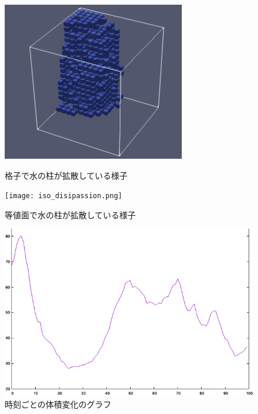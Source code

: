 \documentclass[a4j,12pt]{jreport}
\begin{document}
\begin{figure}[H]
  \begin{minipage}[b]{0.5\linewidth}
    \centering
        \includegraphics[width=80mm]{disipassion.png}
    \caption{格子で水の柱が拡散している様子}
    \label{fig:disipassion1}
  \end{minipage}
  \begin{minipage}[b]{0.45\linewidth}
    \centering
        \texttt{[image: iso\_disipassion.png]}
            \caption{等値面で水の柱が拡散している様子}
    \label{fig:disipassion2}
  \end{minipage}
  \begin{minipage}[b]{0.5\linewidth}
    \centering
    \includegraphics[width=170mm]{graph.png}
    \caption{時刻ごとの体積変化のグラフ}
     \label{fig:graph}
  \end{minipage}

\end{figure}
\end{document}
